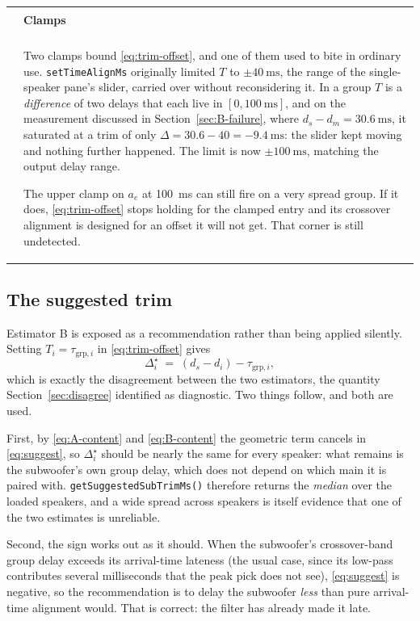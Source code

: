 \documentclass[11pt,a4paper]{article}
\makeatletter
\newcommand{\code}[1]{\texttt{\small #1}}
\newenvironment{remark}[1]
  {\par\medskip\noindent\begin{tabular}{@{}p{0.03\textwidth}p{0.93\textwidth}@{}}
   \textcolor{smtblue}{\rule{2pt}{\baselineskip}} & \textbf{#1}\\[2pt] & \ignorespaces}
  {\end{tabular}\par\medskip}
\makeatother
\begin{document}
\begin{remark}{Clamps}
Two clamps bound \eqref{eq:trim-offset}, and one of them used to bite in ordinary
use. \code{setTimeAlignMs} originally limited $T$ to
$\pm\SI{40}{\milli\second}$, the range of the single-speaker pane's slider,
carried over without reconsidering it. In a group $T$ is a \emph{difference} of
two delays that each live in $[0, \SI{100}{\milli\second}]$, and on the
measurement discussed in Section~\ref{sec:B-failure}, where
$d_s - d_m = \SI{30.6}{\milli\second}$, it saturated at a trim of only
$\Delta = 30.6 - 40 = \SI{-9.4}{\milli\second}$: the slider kept moving and
nothing further happened. The limit is now $\pm\SI{100}{\milli\second}$, matching
the output delay range.

The upper clamp on $a_e$ at \SI{100}{\milli\second} can still fire on a very
spread group. If it does, \eqref{eq:trim-offset} stops holding for the clamped
entry and its crossover alignment is designed for an offset it will not get.
That corner is still undetected.
\end{remark}

\subsection{The suggested trim}

Estimator B is exposed as a recommendation rather than being applied silently.
Setting $T_i = \tau_{\mathrm{grp},i}$ in \eqref{eq:trim-offset} gives
%
\begin{equation}
  \Delta_i^\star \;=\; (d_s - d_i) - \tau_{\mathrm{grp},i},
  \label{eq:suggest}
\end{equation}
%
which is exactly the disagreement between the two estimators, the quantity
Section~\ref{sec:disagree} identified as diagnostic. Two things follow, and both
are used.

First, by \eqref{eq:A-content} and \eqref{eq:B-content} the geometric term
cancels in \eqref{eq:suggest}, so $\Delta_i^\star$ should be nearly the same for
every speaker: what remains is the subwoofer's own group delay, which does not
depend on which main it is paired with. \code{getSuggestedSubTrimMs()} therefore
returns the \emph{median} over the loaded speakers, and a wide spread across
speakers is itself evidence that one of the two estimates is unreliable.

Second, the sign works out as it should. When the subwoofer's crossover-band
group delay exceeds its arrival-time lateness (the usual case, since its
low-pass contributes several milliseconds that the peak pick does not see),
\eqref{eq:suggest} is negative, so the recommendation is to delay the subwoofer
\emph{less} than pure arrival-time alignment would. That is correct: the filter
has already made it late.
\end{document}
